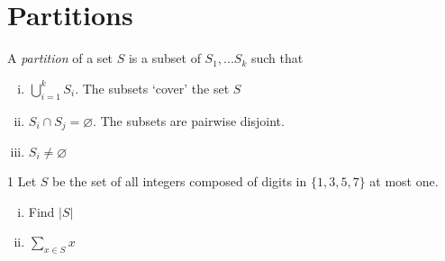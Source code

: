 
% 






% 




\section{Partitions}
    A \textit{partition} of a set $S$ is a subset of $S_1, ... S_k$ such that
\begin{enumerate}[(i)]
        \item $\bigcup\limits_{i=1}^{k} S_{i}$. The subsets `cover' the set $S$
        \item $S_i 	\cap S_j = \varnothing$. The subsets are pairwise disjoint.
        \item $S_i \neq \varnothing$
\end{enumerate}

\begin{problem}
    1 Let $S$ be the set of all integers composed of digits in $\{1, 3, 5, 7\}$ at most one.
    
    \begin{enumerate}[(i)]
        \item Find $|S|$
        \item $\sum\limits_{x \in S} x$
    \end{enumerate}
\end{problem}


